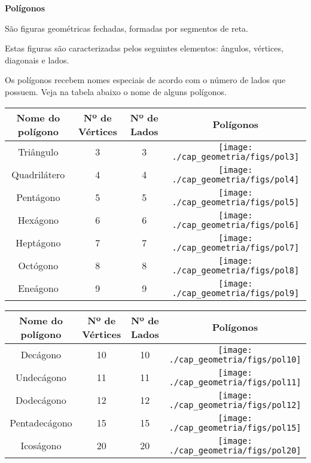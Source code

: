 \vskip0.3cm

\colorbox{azul}{
 \begin{minipage}{0.9\linewidth}
 \begin{center}
 \textbf{Polígonos}

  São figuras geométricas fechadas, formadas por segmentos de reta.

  Estas figuras são caracterizadas pelos seguintes elementos: ângulos, vértices, diagonais e lados.
 \end{center}
 \end{minipage}}

 \vskip0.3cm

  Os polígonos recebem nomes especiais de acordo com o número de lados que possuem. Veja na tabela abaixo o nome de alguns polígonos.


 \begin{table}[H]
 \centering
 \begin{tabular}{|c|c|c|c|} \hline
 \rowcolor{cinza}
 Nome do polígono & Nº de Vértices & Nº de Lados & Polígonos  \\ \hline
 Triângulo & 3 & 3 & \texttt{[image: ./cap\_geometria/figs/pol3]} \\ \hline
 Quadrilátero & 4 & 4 & \texttt{[image: ./cap\_geometria/figs/pol4]} \\ \hline
 Pentágono & 5 & 5 & \texttt{[image: ./cap\_geometria/figs/pol5]} \\ \hline
 Hexágono & 6 & 6 & \texttt{[image: ./cap\_geometria/figs/pol6]} \\ \hline
 Heptágono & 7 & 7 & \texttt{[image: ./cap\_geometria/figs/pol7]} \\ \hline
 Octógono & 8 & 8 & \texttt{[image: ./cap\_geometria/figs/pol8]} \\ \hline
 Eneágono & 9 & 9 & \texttt{[image: ./cap\_geometria/figs/pol9]} \\ \hline
 
 \end{tabular}
\end{table}

 \begin{table}[H]
 \centering
 \begin{tabular}{|c|c|c|c|} \hline
 \rowcolor{cinza}
 Nome do polígono & Nº de Vértices & Nº de Lados & Polígonos  \\ \hline
 Decágono & 10 & 10 & \texttt{[image: ./cap\_geometria/figs/pol10]} \\ \hline
 Undecágono & 11 & 11 & \texttt{[image: ./cap\_geometria/figs/pol11]} \\ \hline
 Dodecágono & 12 & 12 & \texttt{[image: ./cap\_geometria/figs/pol12]} \\ \hline
 Pentadecágono & 15 & 15 & \texttt{[image: ./cap\_geometria/figs/pol15]} \\ \hline
 Icoságono & 20 & 20 & \texttt{[image: ./cap\_geometria/figs/pol20]} \\ \hline
 \end{tabular}
\end{table}

